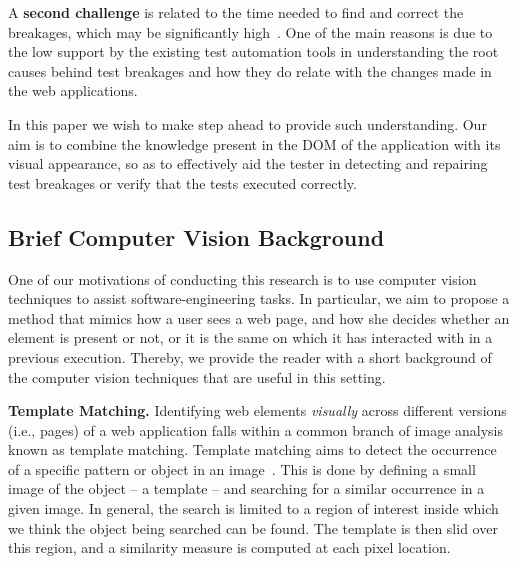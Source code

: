 A \textbf{second challenge} is related to the time needed to find and correct the breakages, which may be significantly high~\cite{Leotta-TAIC-2013,JAMAICA2013}. One of the main reasons is due to the low support by the existing test automation tools in understanding the root causes behind test breakages and how they do relate with the changes made in the web applications. 

In this paper we wish to make step ahead to provide such understanding. 
Our aim is to combine the knowledge present in the DOM of the application with its visual appearance, so as to effectively aid the tester in detecting and repairing test breakages or verify that the tests executed correctly. %


\subsection{Brief Computer Vision Background}\label{sec:cv}

One of our motivations of conducting this research is to use computer vision techniques to assist software-engineering tasks. In particular, we aim to propose a method that mimics how a user sees a web page, and how she decides whether an element is present or not, or it is the same on which it has interacted with in a previous execution. Thereby, we provide the reader with a short background of the computer vision techniques that are useful in this setting.

\noindent
\textbf{Template Matching.}\label{sec:tm}
Identifying web elements \textit{visually} across different versions (i.e., pages) of a web application falls within a common branch of image analysis known as template matching. 
%
Template matching aims to detect the occurrence of a specific pattern or object in an image~\cite{Brunelli:2009:TMT:1643435}. This is done by defining a small image of the object -- a template -- and searching for a similar occurrence in a given image. In general, the search is limited to a region of interest inside which we think the object being searched can be found. The template is then slid over this region, and a similarity measure is computed at each pixel location.

